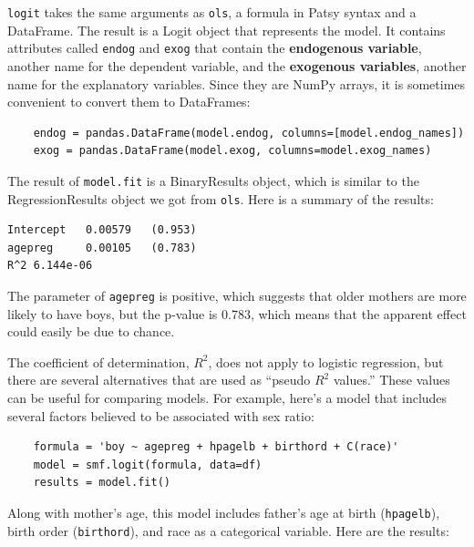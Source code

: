 \documentclass[12pt]{book}
\theoremstyle{exercise}
\begin{document}
{\tt logit} takes the same arguments as {\tt ols}, a formula
in Patsy syntax and a DataFrame.  The result is a Logit object
that represents the model.  It contains attributes called
{\tt endog} and {\tt exog} that contain the {\bf endogenous
variable}, another name for the dependent variable,
and the {\bf exogenous variables}, another name for the
explanatory variables.  Since they are NumPy arrays, it is
sometimes convenient to convert them to DataFrames:%
%
%
%
%
%
%
%

\begin{verbatim}
    endog = pandas.DataFrame(model.endog, columns=[model.endog_names])
    exog = pandas.DataFrame(model.exog, columns=model.exog_names)
\end{verbatim}

The result of {\tt model.fit} is a BinaryResults object, which is
similar to the RegressionResults object we got from {\tt ols}.
Here is a summary of the results:

\begin{verbatim}
Intercept   0.00579   (0.953)
agepreg     0.00105   (0.783)
R^2 6.144e-06
\end{verbatim}

The parameter of {\tt agepreg} is positive, which suggests that
older mothers are more likely to have boys, but the p-value is
0.783, which means that the apparent effect could easily be due
to chance.%
%

The coefficient of determination, $R^2$, does not apply to logistic
regression, but there are several alternatives that are used
as ``pseudo $R^2$ values.''  These values can be useful for comparing
models.  For example, here's a model that includes several factors
believed to be associated with sex ratio:%
%
%
%

\begin{verbatim}
    formula = 'boy ~ agepreg + hpagelb + birthord + C(race)'
    model = smf.logit(formula, data=df)
    results = model.fit()
\end{verbatim}

Along with mother's age, this model includes father's age at
birth ({\tt hpagelb}), birth order ({\tt birthord}), and
race as a categorical variable.  Here are the results:%
\end{document}
